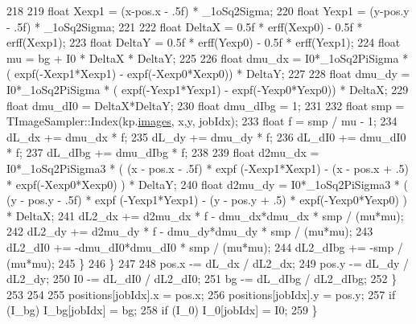 \begin{DoxyCode}
218         
219                 \textcolor{keywordtype}{float} Xexp1 = (x-pos.x - .5f) * \_1oSq2Sigma;
220                 \textcolor{keywordtype}{float} Yexp1 = (y-pos.y - .5f) * \_1oSq2Sigma;
221                 
222                 \textcolor{keywordtype}{float} DeltaX = 0.5f * erff(Xexp0) - 0.5f * erff(Xexp1);
223                 \textcolor{keywordtype}{float} DeltaY = 0.5f * erff(Yexp0) - 0.5f * erff(Yexp1);
224                 \textcolor{keywordtype}{float} mu = bg + I0 * DeltaX * DeltaY;
225                 
226                 \textcolor{keywordtype}{float} dmu\_dx = I0*\_1oSq2PiSigma * ( expf(-Xexp1*Xexp1) - expf(-Xexp0*Xexp0)) * DeltaY;
227 
228                 \textcolor{keywordtype}{float} dmu\_dy = I0*\_1oSq2PiSigma * ( expf(-Yexp1*Yexp1) - expf(-Yexp0*Yexp0)) * DeltaX;
229                 \textcolor{keywordtype}{float} dmu\_dI0 = DeltaX*DeltaY;
230                 \textcolor{keywordtype}{float} dmu\_dIbg = 1;
231         
232                 \textcolor{keywordtype}{float} smp = TImageSampler::Index(kp.\hyperlink{struct_base_kernel_params_abdd6b8722cb871a13069ba0e3cd3ab0b}{images}, x,y, jobIdx);
233                 \textcolor{keywordtype}{float} f = smp / mu - 1;
234                 dL\_dx += dmu\_dx * f;
235                 dL\_dy += dmu\_dy * f;
236                 dL\_dI0 += dmu\_dI0 * f;
237                 dL\_dIbg += dmu\_dIbg * f;
238 
239                 \textcolor{keywordtype}{float} d2mu\_dx = I0*\_1oSq2PiSigma3 * ( (x - pos.x - .5f) * expf (-Xexp1*Xexp1) - (x - pos.x 
      + .5) * expf(-Xexp0*Xexp0) ) * DeltaY;
240                 \textcolor{keywordtype}{float} d2mu\_dy = I0*\_1oSq2PiSigma3 * ( (y - pos.y - .5f) * expf (-Yexp1*Yexp1) - (y - pos.y 
      + .5) * expf(-Yexp0*Yexp0) ) * DeltaX;
241                 dL2\_dx += d2mu\_dx * f - dmu\_dx*dmu\_dx * smp / (mu*mu);
242                 dL2\_dy += d2mu\_dy * f - dmu\_dy*dmu\_dy * smp / (mu*mu);
243                 dL2\_dI0 += -dmu\_dI0*dmu\_dI0 * smp / (mu*mu);
244                 dL2\_dIbg += -smp / (mu*mu);
245             \}
246         \}
247 
248         pos.x -= dL\_dx / dL2\_dx;
249         pos.y -= dL\_dy / dL2\_dy;
250         I0 -= dL\_dI0 / dL2\_dI0;
251         bg -= dL\_dIbg / dL2\_dIbg;
252     \}
253     
254 
255     positions[jobIdx].x = pos.x;
256     positions[jobIdx].y = pos.y;
257     \textcolor{keywordflow}{if} (I\_bg) I\_bg[jobIdx] = bg;
258     \textcolor{keywordflow}{if} (I\_0) I\_0[jobIdx] = I0;
259 \}
\end{DoxyCode}
